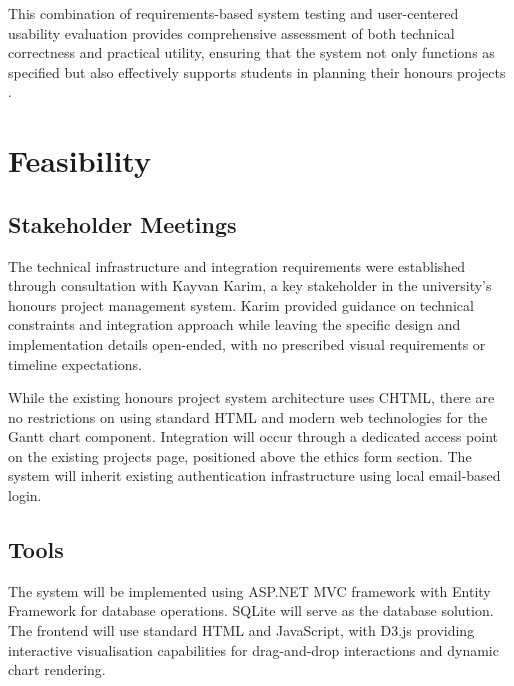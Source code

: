\documentclass[12pt,nonacm,acmlarge,titlepage,screen]{acmart}
\begin{document}
This combination of requirements-based system testing and user-centered usability evaluation provides comprehensive assessment of both technical correctness and practical utility, ensuring that the system not only functions as specified but also effectively supports students in planning their honours projects \cite{Castillo_2025}.
\section{Feasibility} \label{cha:feasibility}
\subsection{Stakeholder Meetings}
The technical infrastructure and integration requirements were established through consultation with Kayvan Karim, a key stakeholder in the university's honours project management system. Karim provided guidance on technical constraints and integration approach while leaving the specific design and implementation details open-ended, with no prescribed visual requirements or timeline expectations.

While the existing honours project system architecture uses CHTML, there are no restrictions on using standard HTML and modern web technologies for the Gantt chart component. Integration will occur through a dedicated access point on the existing projects page, positioned above the ethics form section. The system will inherit existing authentication infrastructure using local email-based login.

\subsection{Tools}

The system will be implemented using ASP.NET MVC framework with Entity Framework for database operations. SQLite will serve as the database solution. The frontend will use standard HTML and JavaScript, with D3.js providing interactive visualisation capabilities for drag-and-drop interactions and dynamic chart rendering. 
\end{document}
